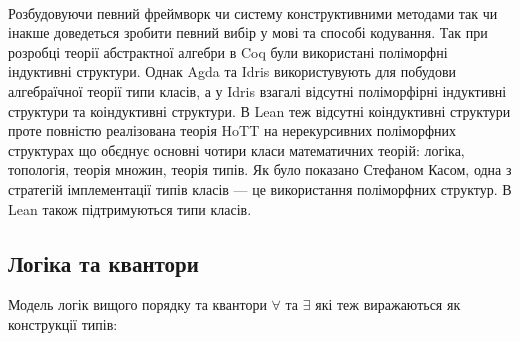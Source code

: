 \documentclass[9pt]{memoir}
\begin{document}
    \paragraph{}
    Розбудовуючи певний фреймворк чи систему конструктивними методами
    так чи інакше доведеться зробити певний вибір у мові та способі кодування.
    Так при розробці теорії абстрактної алгебри в Coq були використані
    поліморфні індуктивні структури. Однак Agda та Idris використувують
    для побудови алгебраїчної теорії типи класів, а у Idris взагалі відсутні
    поліморфірні індуктивні структури та коіндуктивні структури. В Lean
    теж відсутні коіндуктивні структури проте повністю реалізована теорія
    HoTT на нерекурсивних поліморфних структурах що обєднує основні чотири
    класи математичних теорій: логіка, топологія, теорія множин, теорія типів.
    Як було показано Стефаном Касом, одна з
    стратегій імплементації типів класів --- це використання поліморфних структур.
    В Lean також підтримуються типи класів.

\newpage
    \subsection{Логіка та квантори}

    Модель логік вищого порядку та квантори $\forall$ та $\exists$ які
    теж виражаються як конструкції типів:

\begingroup
\parbox[t][][l]{0.40\textwidth}{

\begin{prooftree}
\end{prooftree}

\begin{prooftree}
\end{prooftree}

}
\hspace{0.1cm}
\parbox[t][][r]{0.60\textwidth}{

\begin{prooftree}
\end{prooftree}


\begin{prooftree}
\end{prooftree}

}
\endgroup
\end{document}
